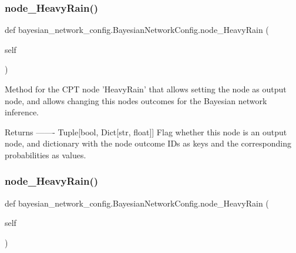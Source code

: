 \subsubsection{\texorpdfstring{node\+\_\+\+Heavy\+Rain()}{node\_HeavyRain()}\hspace{0.1cm}{\footnotesize\ttfamily [2/3]}}
{\footnotesize\ttfamily def bayesian\+\_\+network\+\_\+config.\+Bayesian\+Network\+Config.\+node\+\_\+\+Heavy\+Rain (\begin{DoxyParamCaption}\item[{}]{self }\end{DoxyParamCaption})}

\begin{DoxyVerb}Method for the CPT node 'HeavyRain' that allows setting the node as output node,
and allows changing this nodes outcomes for the Bayesian network inference.

Returns
-------
Tuple[bool, Dict[str, float]]
    Flag whether this node is an output node, and dictionary with the node outcome IDs as keys
    and the corresponding probabilities as values.
\end{DoxyVerb}
 \mbox{\label{classbayesian__network__config_1_1_bayesian_network_config_a7e92e0763a594ce2d1ac0e6cf4ed6658}} 
\subsubsection{\texorpdfstring{node\+\_\+\+Heavy\+Rain()}{node\_HeavyRain()}\hspace{0.1cm}{\footnotesize\ttfamily [3/3]}}
{\footnotesize\ttfamily def bayesian\+\_\+network\+\_\+config.\+Bayesian\+Network\+Config.\+node\+\_\+\+Heavy\+Rain (\begin{DoxyParamCaption}\item[{}]{self }\end{DoxyParamCaption})}

